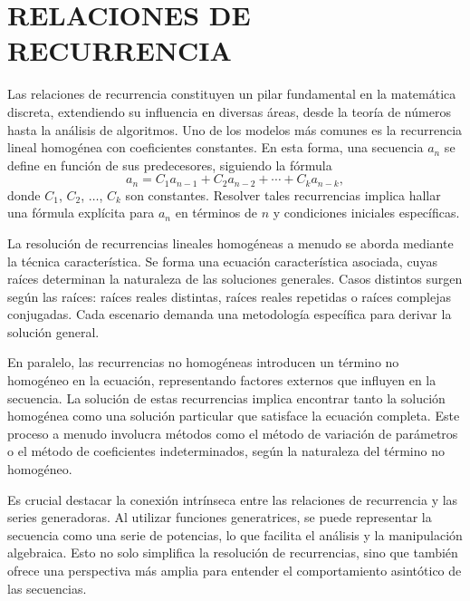 \chapterspaceabove{6.75cm} %
\chapterspacebelow{7.25cm} %


\chapter{RELACIONES DE RECURRENCIA}

Las relaciones de recurrencia constituyen un pilar fundamental en la matemática discreta, extendiendo su influencia en diversas áreas, desde la teoría de números hasta la análisis de algoritmos. Uno de los modelos más comunes es la recurrencia lineal homogénea con coeficientes constantes. En esta forma, una secuencia \(a_n\) se define en función de sus predecesores, siguiendo la fórmula
$$a_n = C_1 a_{n-1} + C_2 a_{n-2} + \cdots + C_k a_{n-k},$$
donde $C_1$, $C_2$, $\dots$, $C_k$ son constantes. Resolver tales recurrencias implica hallar una fórmula explícita para \(a_n\) en términos de \(n\) y condiciones iniciales específicas.

La resolución de recurrencias lineales homogéneas a menudo se aborda mediante la técnica característica. Se forma una ecuación característica asociada, cuyas raíces determinan la naturaleza de las soluciones generales. Casos distintos surgen según las raíces: raíces reales distintas, raíces reales repetidas o raíces complejas conjugadas. Cada escenario demanda una metodología específica para derivar la solución general.

En paralelo, las recurrencias no homogéneas introducen un término no homogéneo en la ecuación, representando factores externos que influyen en la secuencia. La solución de estas recurrencias implica encontrar tanto la solución homogénea como una solución particular que satisface la ecuación completa. Este proceso a menudo involucra métodos como el método de variación de parámetros o el método de coeficientes indeterminados, según la naturaleza del término no homogéneo.

Es crucial destacar la conexión intrínseca entre las relaciones de recurrencia y las series generadoras. Al utilizar funciones generatrices, se puede representar la secuencia como una serie de potencias, lo que facilita el análisis y la manipulación algebraica. Esto no solo simplifica la resolución de recurrencias, sino que también ofrece una perspectiva más amplia para entender el comportamiento asintótico de las secuencias.

